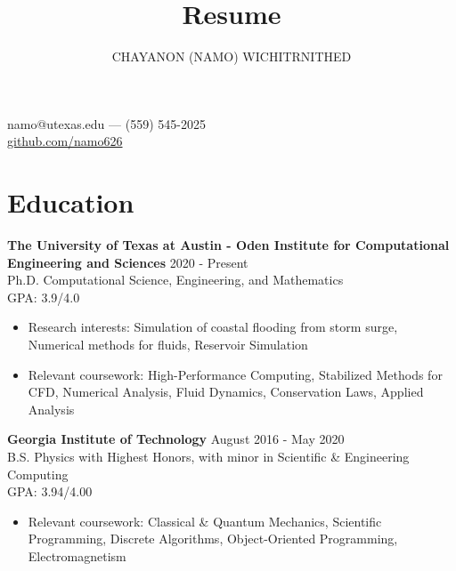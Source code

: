 \documentclass[10pt]{article}
\makeatletter
\renewcommand{\maketitle}{
  \begin{center}
    {\Large\bfseries\theauthor}

    namo@utexas.edu --- (559) 545-2025 \\
    \url{github.com/namo626}
  \end{center}
}
\newenvironment{body}{}
\makeatother
\begin{document}
\title{Resume}
\author{CHAYANON (NAMO) WICHITRNITHED}
\maketitle

\section{Education}
\begin{body}
  \textbf{The University of Texas at Austin - Oden Institute for Computational Engineering and Sciences} \hfill 2020 - Present \\
   Ph.D. Computational Science, Engineering, and Mathematics \\
    GPA: 3.9/4.0
  \begin{itemize}[leftmargin=*,topsep=0pt]
    \setlength\itemsep{-0.3em}
    \item Research interests: Simulation of coastal flooding from storm surge, Numerical methods for fluids, Reservoir Simulation
    \item Relevant coursework: High-Performance Computing, Stabilized Methods for CFD, Numerical Analysis, Fluid Dynamics, Conservation Laws, Applied Analysis
  \end{itemize}
  \medskip
\noindent
  \textbf{Georgia Institute of Technology} \hfill August 2016 - May 2020 \\
  B.S. Physics with Highest Honors, with minor in Scientific \& Engineering Computing \\
  GPA: 3.94/4.00
  \begin{itemize}[leftmargin=*,topsep=0pt]
    \setlength\itemsep{-0.3em}
  \item Relevant coursework: Classical \& Quantum Mechanics, Scientific Programming, Discrete Algorithms, Object-Oriented Programming, Electromagnetism
  \end{itemize}
\end{body}
\end{document}
